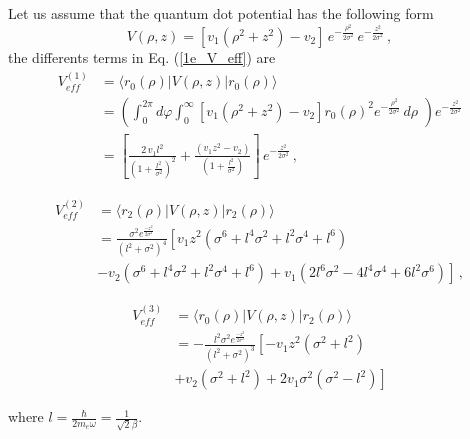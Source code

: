 \documentclass[a4paper,10pt]{article}
\begin{document}
Let us assume that the quantum dot potential has the following form
\begin{equation}
  V(\rho,z) = \left[v_1\left(\rho^2+z^2 \right) - v_2 \right] \,e^{-\frac{\rho^2}{2\sigma^2}}\, e^{-\frac{z^2}{2\sigma^2}}\,,
\end{equation}
\noindent the differents terms in Eq. (\ref{1e_V_eff}) are
\begin{equation}
  \begin{split}
  V_{eff}^{(1)} &= \langle r_0(\rho) \lvert V(\rho,z) \lvert r_0(\rho) \rangle\\
             &= \left(\int_0^{2\pi}d\varphi\int_0^{\infty} \left[v_1\left(\rho^2+z^2 \right) - v_2 \right] r_0(\rho)^2 e^{-\frac{\rho^2}{2\sigma^2}}\,d\rho\,\,\right) e^{-\frac{z^2}{2\sigma^2}} \\
             &= \left[\frac{2\,v_1 l^2}{\left(1 + \frac{l^2}{\sigma^2}\right)^2} + \frac{(v_1 z^2 - v_2)}{\left(1 + \frac{l^2}{\sigma^2}\right)} \right]\, e^{-\frac{z^2}{2\sigma^2}}\, ,
  \end{split}
\end{equation}

\begin{equation}
  \begin{split}
    V_{eff}^{(2)} &= \langle r_2(\rho) \lvert V(\rho,z) \lvert r_2(\rho) \rangle \\
    &= \frac{\sigma^2 e^{\frac{-z^2}{2\sigma^2}}}{(l^2+\sigma^2)^4}\left[v_1 z^2 \left(\sigma^6 + l^4\sigma^2 + l^2\sigma^4 + l^6\right) \right.\\
    &\left.- v_2 \left( \sigma^6 + l^4 \sigma^2 + l^2 \sigma^4 + l^6 \right) +v_1\left( 2l^6\sigma^2 - 4 l^4\sigma^4 + 6l^2\sigma^6 \right) \right]\, ,
  \end{split}
\end{equation}

\begin{equation}
  \begin{split}
    V_{eff}^{(3)} &= \langle r_0(\rho) \lvert V(\rho,z) \lvert r_2(\rho) \rangle \\
    &= -\frac{l^2\sigma^2 e^{\frac{-z^2}{2\sigma^2}}}{(l^2+\sigma^2)^3} \left[-v_1 z^2\left(\sigma^2 + l^2\right) \right.\\
    &\left.+ v_2 \left(\sigma^2 + l^2\right) + 2v_1\sigma^2 \left(\sigma^2 - l^2 \right) \right]
  \end{split}
\end{equation}

\noindent where $l = \frac{\hbar}{2 m_e \omega} = \frac{1}{\sqrt{2}\beta}$.
\end{document}
